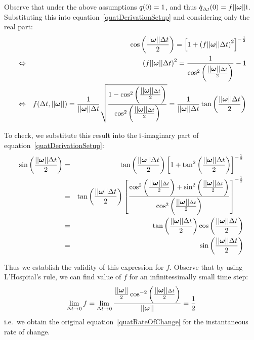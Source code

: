 Observe that under the above assumptions $\mbox{$q$}(0) = 1$, and thus
$\dot{\q{q}}_{\Delta t}(0) = f \norm{\ve{\omega}} \qi$. Substituting this
into equation~\ref{quatDerivationSetup} and considering only the real part:
\begin{eqnarray*}
&& \cos\left(\frac{\norm{\ve{\omega}}\Delta t}{2}\right) =
    \left[1 + \left( f \norm{\ve{\omega}}\Delta t \right)^2 \right]^{-\frac{1}{2}} \\
&\Leftrightarrow&
    \left( f \norm{\ve{\omega}}\Delta t \right)^2 =
    \frac{1}{\cos^2\left(\frac{\norm{\ve{\omega}}\Delta t}{2}\right)} - 1 \\
&\Leftrightarrow&
    f(\Delta t, \norm{\ve{\omega}}) =
    \frac{1}{\norm{\ve{\omega}}\Delta t} \sqrt{\frac{
        1 - \cos^2\left(\frac{\norm{\ve{\omega}}\Delta t}{2}\right)}{
        \cos^2\left(\frac{\norm{\ve{\omega}}\Delta t}{2}\right)}} =
    \frac{1}{\norm{\ve{\omega}}\Delta t}
        \tan\left(\frac{\norm{\ve{\omega}}\Delta t}{2}\right)
\end{eqnarray*}

To check, we substitute this result into the $\mbox{$\mathrm{i}$}$-imaginary part of
equation~\ref{quatDerivationSetup}:
\begin{eqnarray*}
\sin\left(\frac{\norm{\ve{\omega}}\Delta t}{2}\right) & = &
    \tan\left(\frac{\norm{\ve{\omega}}\Delta t}{2}\right)
    \left[ 1 + \tan^2\left(\frac{\norm{\ve{\omega}}\Delta t}{2}\right)
    \right]^{-\frac{1}{2}} \\
&=& \tan\left(\frac{\norm{\ve{\omega}}\Delta t}{2}\right)
    \left[ \frac{\cos^2\left(\frac{\norm{\ve{\omega}}\Delta t}{2}\right) +
    \sin^2\left(\frac{\norm{\ve{\omega}}\Delta t}{2}\right) }{
    \cos^2\left(\frac{\norm{\ve{\omega}}\Delta t}{2}\right) }
    \right]^{-\frac{1}{2}} \\
&=& \tan\left(\frac{\norm{\ve{\omega}}\Delta t}{2}\right)
    \cos\left(\frac{\norm{\ve{\omega}}\Delta t}{2}\right) \\
&=& \sin\left(\frac{\norm{\ve{\omega}}\Delta t}{2}\right)
\end{eqnarray*}

Thus we establish the validity of this expression for $f$. Observe that by using 
L'Hospital's rule, we can find value of $f$ for an infinitessimally small time step:
$$
\lim_{\Delta t \to 0} f = \lim_{\Delta t \to 0} \frac{ \frac{\norm{\ve{\omega}}}{2}
    \cos^{-2}\left(\frac{\norm{\ve{\omega}}\Delta t}{2}\right) }{ \norm{\ve{\omega}} } =
    \frac{1}{2}
$$
i.e.\ we obtain the original equation~\ref{quatRateOfChange} for the
instantaneous rate of change.

